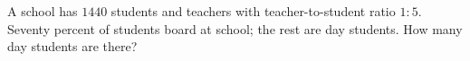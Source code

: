 A school has $1440$ students and teachers with teacher-to-student ratio $1:5$. Seventy percent of students board at school; the rest are day students. How many day students are there?
